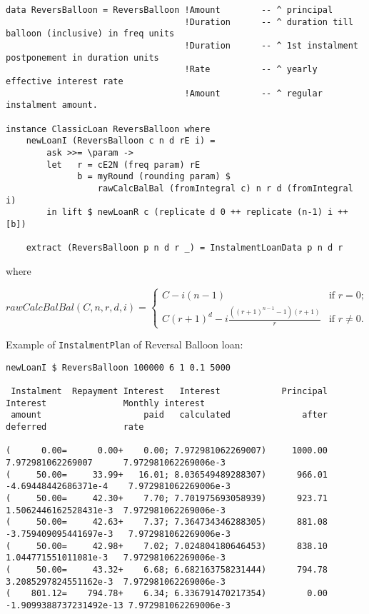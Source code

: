 \documentclass[letterpaper,11pt]{article}
\begin{document}
{\small
\begin{verbatim}
data ReversBalloon = ReversBalloon !Amount        -- ^ principal
                                   !Duration      -- ^ duration till balloon (inclusive) in freq units
                                   !Duration      -- ^ 1st instalment postponement in duration units
                                   !Rate          -- ^ yearly effective interest rate
                                   !Amount        -- ^ regular instalment amount.

instance ClassicLoan ReversBalloon where
    newLoanI (ReversBalloon c n d rE i) =
        ask >>= \param ->
        let   r = cE2N (freq param) rE
              b = myRound (rounding param) $
                  rawCalcBalBal (fromIntegral c) n r d (fromIntegral i)
        in lift $ newLoanR c (replicate d 0 ++ replicate (n-1) i ++ [b])

    extract (ReversBalloon p n d r _) = InstalmentLoanData p n d r
\end{verbatim}
}

where

\begin{equation}
rawCalcBalBal (C, n, r, d, i) = \left\{ \begin{array}{ll}
                                    C-i(n-1)& \mbox{if $r=0$};\\
                                    C(r+1)^d - i \frac{((r+1)^{n-1}-1)(r+1)}{r} & \mbox{if $r \neq 0$}.
                                    \end{array} \right.
\end{equation}

Example of {\tt InstalmentPlan} of Reversal Balloon loan:
{\footnotesize
\begin{samepage}
\begin{verbatim}
newLoanI $ ReversBalloon 100000 6 1 0.1 5000

 Instalment  Repayment Interest   Interest            Principal  Interest               Monthly interest
 amount                    paid   calculated              after  deferred               rate

(      0.00=      0.00+    0.00; 7.972981062269007)     1000.00  7.972981062269007      7.972981062269006e-3
(     50.00=     33.99+   16.01; 8.036549489288307)      966.01 -4.69448442686371e-4    7.972981062269006e-3
(     50.00=     42.30+    7.70; 7.701975693058939)      923.71  1.5062446162528431e-3  7.972981062269006e-3
(     50.00=     42.63+    7.37; 7.364734346288305)      881.08 -3.759409095441697e-3   7.972981062269006e-3
(     50.00=     42.98+    7.02; 7.024804180646453)      838.10  1.044771551011081e-3   7.972981062269006e-3
(     50.00=     43.32+    6.68; 6.682163758231444)      794.78  3.2085297824551162e-3  7.972981062269006e-3
(    801.12=    794.78+    6.34; 6.336791470217354)        0.00 -1.9099388737231492e-13 7.972981062269006e-3
\end{verbatim}
\end{samepage}
}
\end{document}
